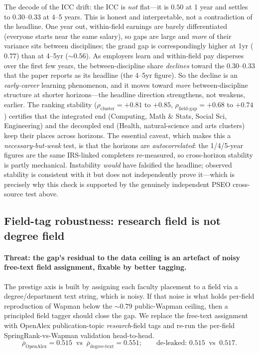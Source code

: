 \documentclass[11pt]{article}
\begin{document}
The decode of the ICC drift: the ICC is \emph{not} flat---it is $0.50$ at 1 year and settles to $0.30$--$0.33$ at 4--5 years. This is honest and interpretable, not a contradiction of the headline. One year out, within-field earnings are barely differentiated (everyone starts near the same salary), so gaps are large and \emph{more} of their variance sits between disciplines; the grand gap is correspondingly higher at 1yr ($0.77$) than at 4--5yr ($\sim0.56$). As employers learn and within-field pay disperses over the first few years, the between-discipline share \emph{declines} toward the $0.30$--$0.33$ that the paper reports as its headline (the 4--5yr figure). So the decline is an \emph{early-career} learning phenomenon, and it moves toward \emph{more} between-discipline structure at shorter horizons---the headline direction strengthens, not weakens, earlier. The ranking stability ($\rho_{\text{cluster}}=+0.81$ to $+0.85$, $\rho_{\text{field-gap}}=+0.68$ to $+0.74$) certifies that the integrated end (Computing, Math \& Stats, Social Sci, Engineering) and the decoupled end (Health, natural-science and arts clusters) keep their places across horizons. The essential caveat, which makes this a \emph{necessary-but-weak} test, is that the horizons are \emph{autocorrelated}: the 1/4/5-year figures are the same IRS-linked completers re-measured, so cross-horizon stability is partly mechanical. Instability \emph{would} have falsified the headline; observed stability is consistent with it but does not independently prove it---which is precisely why this check is supported by the genuinely independent PSEO cross-source test above.

\subsection{Field-tag robustness: research field is not degree field}

\paragraph{Threat: the gap's residual to the data ceiling is an artefact of noisy free-text field assignment, fixable by better tagging.}
The prestige axis is built by assigning each faculty placement to a field via a degree/department text string, which is noisy. If that noise is what holds per-field reproduction of Wapman below the $\sim0.79$ public-Wapman ceiling, then a principled field tagger should close the gap. We replace the free-text assignment with OpenAlex publication-topic \emph{research}-field tags and re-run the per-field SpringRank-vs-Wapman validation head-to-head.
\[
\overline{\rho}_{\text{OpenAlex}}=0.515 \;\;\text{vs}\;\; \overline{\rho}_{\text{degree-text}}=0.551;\qquad
\text{de-leaked: } 0.515 \;\;\text{vs}\;\; 0.517 .
\]
\end{document}

